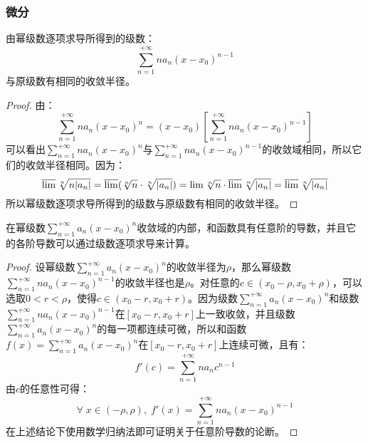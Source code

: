 \subsubsection{微分}
\begin{theorem}
	由幂级数逐项求导所得到的级数：
	\begin{equation*}
		\sum_{n=1}^{+\infty}na_n(x-x_0)^{n-1}
	\end{equation*}
	与原级数有相同的收敛半径。
\end{theorem}
\begin{proof}
	由：
	\begin{equation*}
		\sum_{n=1}^{+\infty}na_n(x-x_0)^{n}=(x-x_0)\left[\sum_{n=1}^{+\infty}na_n(x-x_0)^{n-1}\right]
	\end{equation*}
	可以看出$\sum\limits_{n=1}^{+\infty}na_n(x-x_0)^{n}$与$\sum\limits_{n=1}^{+\infty}na_n(x-x_0)^{n-1}$的收敛域相同，所以它们的收敛半径相同。因为：
	\begin{equation*}
		\varlimsup\sqrt[n]{n|a_n|}=\varlimsup(\sqrt[n]{n}\cdot\sqrt[n]{|a_n|})=\lim\sqrt[n]{n}\cdot\varlimsup\sqrt[n]{|a_n|}=\varlimsup\sqrt[n]{|a_n|}
	\end{equation*}
	所以幂级数逐项求导所得到的级数与原级数有相同的收敛半径。
\end{proof}
\begin{theorem}
	在幂级数$\sum\limits_{n=1}^{+\infty}a_n(x-x_0)^n$收敛域的内部，和函数具有任意阶的导数，并且它的各阶导数可以通过级数逐项求导来计算。
\end{theorem}
\begin{proof}
	设幂级数$\sum\limits_{n=1}^{+\infty}a_n(x-x_0)^n$的收敛半径为$\rho$，那么幂级数$\sum\limits_{n=1}^{+\infty}na_n(x-x_0)^{n-1}$的收敛半径也是$\rho$。对任意的$c\in(x_0-\rho,x_0+\rho)$，可以选取$0<r<\rho$，使得$c\in(x_0-r,x_0+r)$。因为级数$\sum\limits_{n=1}^{+\infty}a_n(x-x_0)^n$和级数$\sum\limits_{n=1}^{+\infty}na_n(x-x_0)^{n-1}$在$[x_0-r,x_0+r]$上一致收敛，并且级数$\sum\limits_{n=1}^{+\infty}a_n(x-x_0)^n$的每一项都连续可微，所以和函数$f(x)=\sum\limits_{n=1}^{+\infty}a_n(x-x_0)^n$在$[x_0-r,x_0+r]$上连续可微，且有：
	\begin{equation*}
		f'(c)=\sum_{n=1}^{+\infty}na_nc^{n-1}
	\end{equation*}
	由$c$的任意性可得：
	\begin{equation*}
		\forall\;x\in(-\rho,\rho),\;f'(x)=\sum_{n=1}^{+\infty}na_n(x-x_0)^{n-1}
	\end{equation*}
	在上述结论下使用数学归纳法即可证明关于任意阶导数的论断。
\end{proof}
